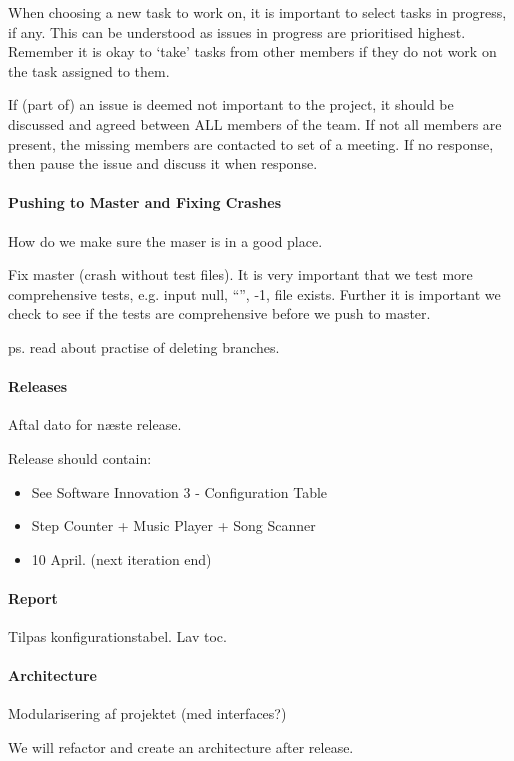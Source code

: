 When choosing a new task to work on, it is important to select tasks in progress, if any. This can be understood as issues in progress are prioritised highest. Remember it is okay to ‘take’ tasks from other members if they do not work on the task assigned to them.

If (part of) an issue is deemed not important to the project, it should be discussed and agreed between ALL members of the team. If not all members are present, the missing members are contacted to set of a meeting. If no response, then pause the issue and discuss it when response. 

\paragraph{Pushing to Master and Fixing Crashes}
How do we make sure the maser is in a good place.

Fix master (crash without test files).
It is very important that we test more comprehensive tests, e.g. input null, “”, -1, file exists. 
Further it is important we check to see if the tests are comprehensive before we push to master.

ps. read about practise of deleting branches.

\paragraph{Releases}
Aftal dato for næste release.

Release should contain:
\begin{itemize}
\item See Software Innovation 3 - Configuration Table
\item Step Counter + Music Player + Song Scanner
\item 10 April. (next iteration end)
\end{itemize}

\paragraph{Report}
Tilpas konfigurationstabel.
Lav toc. 

\paragraph{Architecture}
Modularisering af projektet (med interfaces?)

We will refactor and create an architecture after release.
